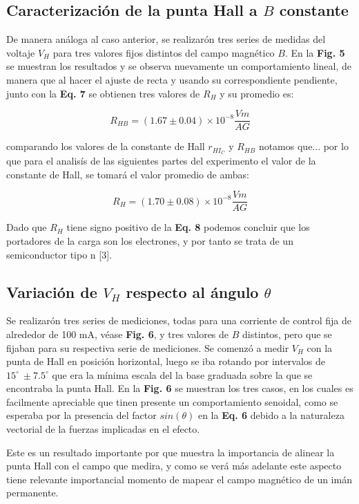 \documentclass[twocolumn,showpacs,preprintnumbers,amsmath,amssymb]{revtex4-1}
\begin{document}
\subsection{Caracterización de la punta Hall a $B$ constante}

De manera análoga al caso anterior, se realizarón tres series de medidas del voltaje $V_H$ para tres valores fijos distintos del
campo magnético $B$. En la \textbf{Fig. 5} se muestran los resultados y se observa nuevamente un comportamiento lineal, de
manera que al hacer el ajuste de recta y usando su correspondiente pendiente, junto con la \textbf{Eq. 7} se obtienen tres valores
de $R_H$ y su promedio es:

$$R_{HB} = (1.67 \pm 0.04)\times10^{-8} \frac{Vm}{AG}$$

comparando los valores de la constante de Hall $r_{HI_C}$ y $R_{HB}$ notamos que... por lo que para el analisís de las siguientes partes del
experimento el valor de la constante de Hall, se tomará el valor promedio de ambas:

$$R_H = (1.70 \pm 0.08)\times10^{-8} \frac{Vm}{AG}$$



Dado que $R_H$ tiene signo positivo de la \textbf{Eq. 8} podemos concluir que los portadores de la carga son los electrones, y por tanto
se trata de un semiconductor tipo n [3].

\subsection{Variación de $V_H$ respecto al ángulo $\theta$}


Se realizarón tres series de mediciones, todas para una corriente de control fija de alrededor de 100 mA, véase \textbf{Fig. 6}, y
tres valores de $B$ distintos, pero que se fijaban para su respectiva serie de mediciones. Se comenzó a medir $V_H$ con
la punta de Hall en posición horizontal, luego se iba rotando por intervalos de $15^\circ\ \pm 7.5^\circ$ que era la mínima escala del la
base graduada sobre la que se encontraba la punta Hall. En la \textbf{Fig. 6} se muestran los tres casos, en los cuales
es facilmente apreciable que tinen presente un comportamiento senoidal, como se esperaba por la presencia del factor $sin(\theta)$
en la \textbf{Eq. 6} debido a la naturaleza vectorial de la fuerzas implicadas en el efecto.

Este es un resultado importante por que muestra la importancia de alinear la punta Hall con el campo que medira, y como se verá más adelante
este aspecto tiene relevante importancial momento de mapear el campo magnético de un imán permanente.
\end{document}
